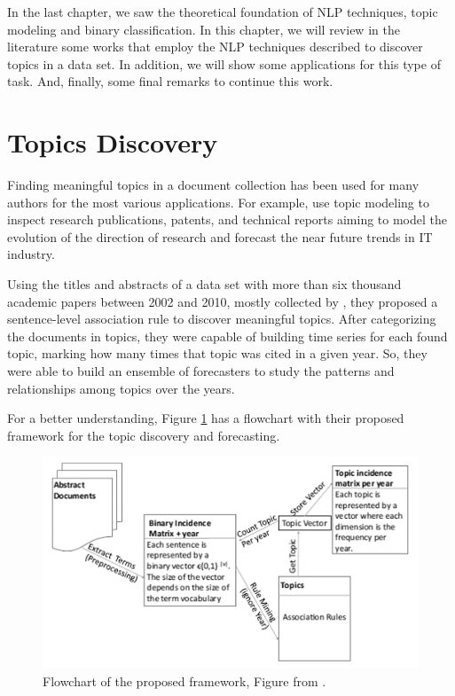 In the last chapter, we saw the theoretical foundation of NLP techniques, topic modeling and binary classification. In this chapter, we will review in the literature some works that employ the NLP techniques described to discover topics in a data set. In addition, we will show some applications for this type of task. And, finally, some final remarks to continue this work.


\section{Topics Discovery}

Finding meaningful topics in a document collection has been used for many authors for the most various applications. For example,  use topic modeling to inspect research publications, patents, and technical reports aiming to model the evolution of the direction of research and forecast the near future trends in IT industry.

Using the titles and abstracts of a data set with more than six thousand academic papers between 2002 and 2010, mostly collected by , they proposed a sentence-level association rule to discover meaningful topics. After categorizing the documents in topics, they were capable of building time series for each found topic, marking how many times that topic was cited in a given year. So, they were able to build an ensemble of forecasters to study the patterns and relationships among topics over the years.

For a better understanding, Figure \ref{fig:topic-discovery-framework} has a flowchart with their proposed framework for the topic discovery and forecasting.

\begin{figure}[h!]
	\centering
	\includegraphics[width=0.6\linewidth]{01.Chapters/03.RelatedWorks/topic-discovery-framework}
	\caption{Flowchart of the proposed framework, Figure from  \cite{hurtado2016topic}.}
	\label{fig:topic-discovery-framework}
\end{figure}

